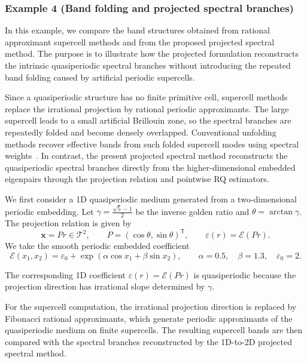 \documentclass[11pt]{article}
\numberwithin{equation}{section}
\begin{document}
\subsubsection*{Example 4 (Band folding and projected spectral branches)}
\label{subsec:band_unfolding_fractal}

In this example, we compare the band structures obtained from rational approximant supercell methods and from the proposed projected spectral method. The purpose is to illustrate how the projected formulation reconstructs the intrinsic quasiperiodic spectral branches without introducing the repeated band folding caused by artificial periodic supercells.

Since a quasiperiodic structure has no finite primitive cell, supercell methods replace the irrational projection by rational periodic approximants. The large supercell leads to a small artificial Brillouin zone, so the spectral branches are repeatedly folded and become densely overlapped. Conventional unfolding methods recover effective bands from such folded supercell modes using spectral weights~\cite{zhang2022unfolded}. In contrast, the present projected spectral method reconstructs the quasiperiodic spectral branches directly from the higher-dimensional embedded eigenpairs through the projection relation and pointwise RQ estimators.


We first consider a 1D quasiperiodic medium generated from a two-dimensional
periodic embedding. Let
$\gamma=\frac{\sqrt{5}-1}{2}$ be the inverse golden ratio and
$\theta=\arctan\gamma$. The projection relation is given by
\begin{equation}
    \mathbf{x}=Pr\in\mathcal{T}^2,
    \qquad
    P=(\cos\theta,\sin\theta)^{\mathsf T},
    \qquad
    \varepsilon(r)=\mathcal{E}(Pr).
\end{equation}
We take the smooth periodic embedded coefficient
\begin{equation}
\mathcal{E}(x_1,x_2)
=
\varepsilon_0
+
\exp\!\left(
\alpha\cos x_1+\beta\sin x_2
\right),
\qquad
\alpha=0.5,\quad
\beta=1.3,\quad
\varepsilon_0=2.
\label{eq:smooth_2D_embedding_coefficient}
\end{equation}

The corresponding 1D coefficient
$\varepsilon(r)=\mathcal{E}(Pr)$ is quasiperiodic because the projection
direction has irrational slope determined by $\gamma$.

For the supercell computation, the irrational projection direction is replaced
by Fibonacci rational approximants, which generate periodic approximants of the
quasiperiodic medium on finite supercells. The resulting supercell bands are
then compared with the spectral branches reconstructed by the 1D-to-2D
projected spectral method.
\end{document}
